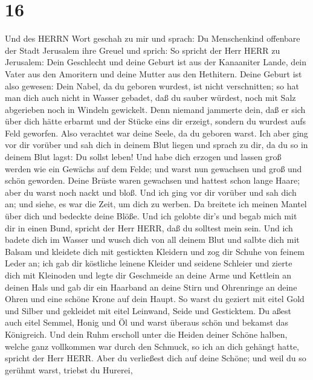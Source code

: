 \hypertarget{section-15}{%
\section{16}\label{section-15}}

 Und des HERRN Wort geschah zu mir und sprach: 
Du Menschenkind offenbare der Stadt Jerusalem ihre Greuel und sprich:
 So spricht der Herr HERR zu Jerusalem: Dein Geschlecht und
deine Geburt ist aus der Kanaaniter Lande, dein Vater aus den Amoritern
und deine Mutter aus den Hethitern.  Deine Geburt ist also
gewesen: Dein Nabel, da du geboren wurdest, ist nicht verschnitten; so
hat man dich auch nicht in Wasser gebadet, daß du sauber würdest, noch
mit Salz abgerieben noch in Windeln gewickelt.  Denn niemand
jammerte dein, daß er sich über dich hätte erbarmt und der Stücke eins
dir erzeigt, sondern du wurdest aufs Feld geworfen. Also verachtet war
deine Seele, da du geboren warst.  Ich aber ging vor dir
vorüber und sah dich in deinem Blut liegen und sprach zu dir, da du so
in deinem Blut lagst: Du sollst leben!  Und habe dich
erzogen und lassen groß werden wie ein Gewächs auf dem Felde; und warst
nun gewachsen und groß und schön geworden. Deine Brüste waren gewachsen
und hattest schon lange Haare; aber du warst noch nackt und bloß.
 Und ich ging vor dir vorüber und sah dich an; und siehe, es
war die Zeit, um dich zu werben. Da breitete ich meinen Mantel über dich
und bedeckte deine Blöße. Und ich gelobte dir's und begab mich mit dir
in einen Bund, spricht der Herr HERR, daß du solltest mein sein.
 Und ich badete dich im Wasser und wusch dich von all deinem
Blut und salbte dich mit Balsam  und kleidete dich mit
gestickten Kleidern und zog dir Schuhe von feinem Leder an; ich gab dir
köstliche leinene Kleider und seidene Schleier  und zierte
dich mit Kleinoden und legte dir Geschmeide an deine Arme und Kettlein
an deinen Hals  und gab dir ein Haarband an deine Stirn und
Ohrenringe an deine Ohren und eine schöne Krone auf dein Haupt.
 So warst du geziert mit eitel Gold und Silber und
gekleidet mit eitel Leinwand, Seide und Gesticktem. Du aßest auch eitel
Semmel, Honig und Öl und warst überaus schön und bekamst das Königreich.
 Und dein Ruhm erscholl unter die Heiden deiner Schöne
halben, welche ganz vollkommen war durch den Schmuck, so ich an dich
gehängt hatte, spricht der Herr HERR.  Aber du verließest
dich auf deine Schöne; und weil du so gerühmt warst, triebst du Hurerei,
